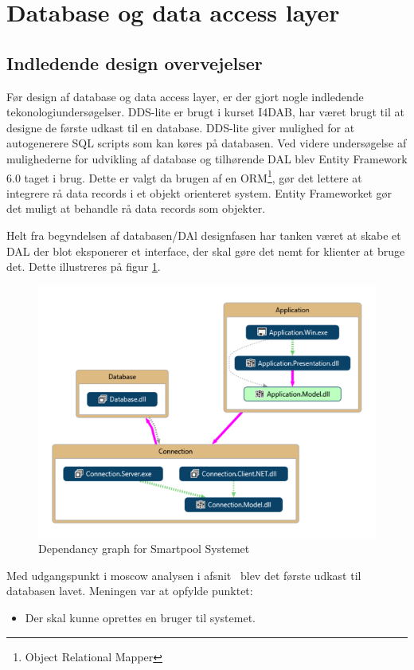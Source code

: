 \section{Database og data access layer}

\subsection{Indledende design overvejelser}
Før design af database og data access layer, er der gjort nogle indledende tekonologiundersøgelser. DDS-lite er brugt i kurset I4DAB, har været brugt til at designe de første udkast til en database. DDS-lite giver mulighed for at autogenerere SQL scripts som kan køres på databasen. Ved videre undersøgelse af mulighederne for udvikling af database og tilhørende DAL blev Entity Framework 6.0 taget i brug. Dette er valgt da brugen af en ORM\footnote{Object Relational Mapper}, gør det lettere at integrere rå data records i et objekt orienteret system. Entity Frameworket gør det muligt at behandle rå data records som objekter. 

Helt fra begyndelsen af databasen/DAl designfasen har tanken været at skabe et DAL der blot eksponerer et interface, der skal gøre det nemt for klienter at bruge det. Dette illustreres på figur \ref{fig:vs_codeMap}.


\begin{figure}[h]
\centering
\includegraphics[width=0.7\linewidth]{figs/design/vs_codeMap.PNG}
\caption{Dependancy graph for Smartpool Systemet}
\label{fig:vs_codeMap}
\end{figure}


Med udgangspunkt i \gls{moscow} analysen i afsnit~\pageref{sec:moscow} blev det første udkast til databasen lavet. Meningen var at opfylde punktet: 

\begin{itemize}
	\item Der skal kunne oprettes en bruger til systemet.
\end{itemize}

